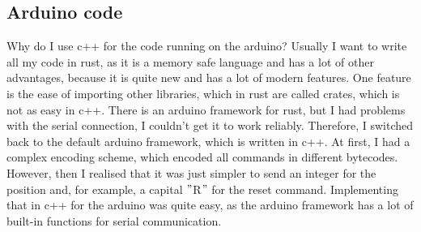 \subsection{Arduino code}\label{subsec:arduino-code}
Why do I use c++ for the code running on the arduino?
Usually I want to write all my code in rust, as it is a memory safe language and has a lot of other advantages, because it is quite new and has a lot of modern features.
One feature is the ease of importing other libraries, which in rust are called crates, which is not as easy in c++.
There is an arduino framework for rust, but I had problems with the serial connection, I couldn't get it to work reliably.
Therefore, I switched back to the default arduino framework, which is written in c++.
At first, I had a complex encoding scheme, which encoded all commands in different bytecodes.
However, then I realised that it was just simpler to send an integer for the position and, for example, a capital \("\)R\("\) for the reset command.
Implementing that in c++ for the arduino was quite easy, as the arduino framework has a lot of built-in functions for serial communication.
